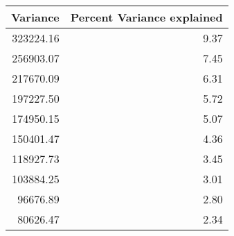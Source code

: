 \begin{tabular}{rr}
\toprule
Variance & Percent Variance explained \\
\midrule
323224.16 & 9.37 \\
256903.07 & 7.45 \\
217670.09 & 6.31 \\
197227.50 & 5.72 \\
174950.15 & 5.07 \\
150401.47 & 4.36 \\
118927.73 & 3.45 \\
103884.25 & 3.01 \\
96676.89 & 2.80 \\
80626.47 & 2.34 \\
\bottomrule
\end{tabular}
